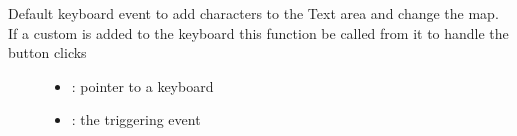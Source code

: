 \documentclass[letterpaper,10pt,english]{sphinxmanual}
\begin{document}

\begin{fulllineitems}
\label{\detokenize{object-types/kb:_CPPv418lv_kb_def_event_cbP8lv_obj_t10lv_event_t}}%
\pysigstartmultiline
{}\label{\detokenize{object-types/kb:lv__kb_8h_1a9f5a6dd36f6ce69e82f7dc9ec928346d}}%
\pysigstopmultiline
Default keyboard event to add characters to the Text area and change the map. If a custom  is added to the keyboard this function be called from it to handle the button clicks \begin{description}
\item[{}] \leavevmode\begin{itemize}
\item {} 
: pointer to a keyboard 

\item {} 
: the triggering event 

\end{itemize}

\end{description}


\end{fulllineitems}

\end{document}
